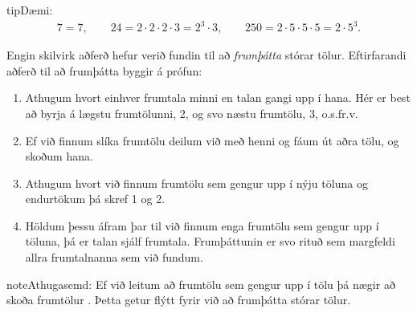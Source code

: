 \documentclass[a4paper,10pt,icelandic]{sphinxmanual}
\begin{document}
\begin{sphinxadmonition}{tip}{Dæmi:}\begin{equation*}
\begin{split}7=7, \qquad 24=2 \cdot 2 \cdot 2 \cdot 3=2^3 \cdot 3, \qquad 250= 2 \cdot 5 \cdot 5 \cdot 5=2 \cdot 5^3.\end{split}
\end{equation*}\end{sphinxadmonition}

Engin skilvirk aðferð hefur verið fundin til að \textit{frumþátta} stórar tölur. Eftirfarandi aðferð til að frumþátta byggir á prófun:
\begin{enumerate}
%
\item {} 
Athugum hvort einhver frumtala minni en talan gangi upp í hana. Hér er best að byrja á lægstu frumtölunni, 2, og svo næstu frumtölu, 3, o.s.fr.v.

\item {} 
Ef við finnum slíka frumtölu deilum við með henni og fáum út aðra tölu, og skoðum hana.

\item {} 
Athugum hvort við finnum frumtölu sem gengur upp í nýju töluna og endurtökum þá skref 1 og 2.

\item {} 
Höldum þessu áfram þar til við finnum enga frumtölu sem gengur upp í töluna, þá er talan sjálf frumtala. Frumþáttunin er svo rituð sem margfeldi allra frumtalnanna sem við fundum.

\end{enumerate}

\begin{sphinxadmonition}{note}{Athugasemd:}
Ef við leitum að frumtölu sem gengur upp í tölu þá nægir að skoða frumtölur . Þetta getur flýtt fyrir við að frumþátta stórar tölur.
\end{sphinxadmonition}
\end{document}
